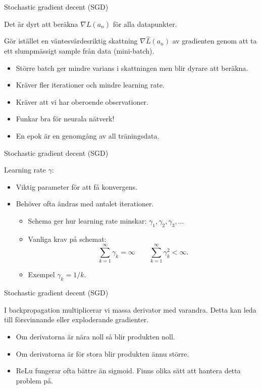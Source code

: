 \documentclass[10pt,english]{beamer}
\begin{document}
\begin{frame}{Stochastic gradient decent (SGD)}

    Det är dyrt att beräkna $\nabla L(a_n)$ för alla datapunkter.

    Gör istället en väntesvärdesriktig skattning $\nabla \hat{L}(a_n)$ av gradienten genom att ta ett slumpmässigt sample från data (mini-batch).

    \begin{itemize}
        \item Större batch ger mindre varians i skattningen men blir dyrare att beräkna.
        \item Kräver fler iterationer och mindre learning rate.
        \item Kräver att vi har oberoende observationer.
        \item Funkar bra för neurala nätverk!
        \item En epok är en genomgång av all träningsdata.
    \end{itemize}
    
\end{frame}

\begin{frame}{Stochastic gradient decent (SGD)}
    
    Learning rate $\gamma$:
    \begin{itemize}
        \item Viktig parameter för att få konvergens.
        \item Behöver ofta ändras med antalet iterationer.
        \begin{itemize}
            \item Schema ger hur learning rate minskar: $\gamma_1, \gamma_2, \gamma_3, \ldots$
            \item Vanliga krav på schemat:
            \begin{equation*}
                \sum_{k=1}^{\infty} \gamma_k = \infty \qquad \sum_{k=1}^{\infty} \gamma_k^2 < \infty.
            \end{equation*}
            \item Exempel $\gamma_k = 1/k$.
        \end{itemize}
    \end{itemize}

\end{frame}

\begin{frame}{Stochastic gradient decent (SGD)}
    
     I backpropagation multiplicerar vi massa derivator med varandra. Detta kan leda till försvinnande eller exploderande gradienter.
    \begin{itemize}
        \item Om derivatorna är nära noll så blir produkten noll.
        \item Om derivatorna är för stora blir produkten ännu större.
        \item ReLu fungerar ofta bättre än sigmoid. Finns olika sätt att hantera detta problem på.
    \end{itemize}

\end{frame}
\end{document}
